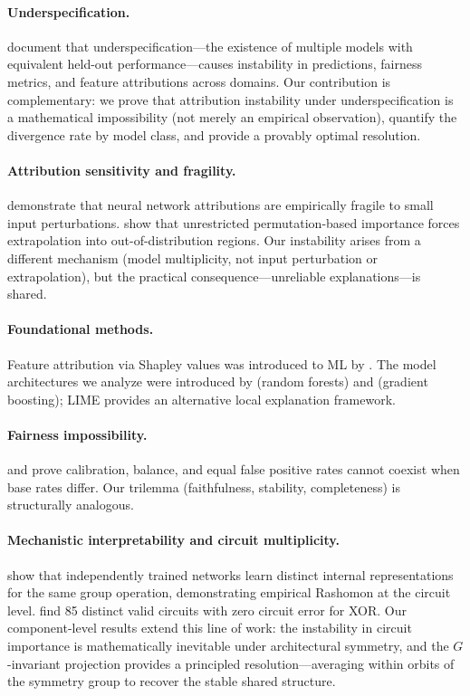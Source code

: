 \documentclass{article}
\begin{document}
\paragraph{Underspecification.}
\citet{damour2022underspecification} document that underspecification---the existence of multiple models with equivalent held-out performance---causes instability in predictions, fairness metrics, and feature attributions across domains. Our contribution is complementary: we prove that attribution instability under underspecification is a mathematical impossibility (not merely an empirical observation), quantify the divergence rate by model class, and provide a provably optimal resolution.

\paragraph{Attribution sensitivity and fragility.}
\citet{ghorbani2019data} demonstrate that neural network attributions are empirically fragile to small input perturbations.
\citet{hooker2021unrestricted} show that unrestricted permutation-based importance forces extrapolation into out-of-distribution regions.
Our instability arises from a different mechanism (model multiplicity, not input perturbation or extrapolation), but the practical consequence---unreliable explanations---is shared.

\paragraph{Foundational methods.}
Feature attribution via Shapley values \citep{shapley1953value} was introduced to ML by \citet{lundberg2017unified}.
The model architectures we analyze were introduced by \citet{breiman2001random} (random forests) and \citet{friedman2001greedy} (gradient boosting); LIME \citep{ribeiro2016should} provides an alternative local explanation framework.

\paragraph{Fairness impossibility.}
\citet{chouldechova2017fair} and \citet{kleinberg2017inherent} prove calibration, balance, and equal false positive rates cannot coexist when base rates differ. Our trilemma (faithfulness, stability, completeness) is structurally analogous.

\paragraph{Mechanistic interpretability and circuit multiplicity.}
\citet{chughtai2023toy} show that independently trained networks learn distinct internal representations for the same group operation, demonstrating empirical Rashomon at the circuit level. \citet{meloux2025circuits} find 85 distinct valid circuits with zero circuit error for XOR. Our component-level results extend this line of work: the instability in circuit importance is mathematically inevitable under architectural symmetry, and the $G$-invariant projection provides a principled resolution---averaging within orbits of the symmetry group to recover the stable shared structure.
\end{document}
